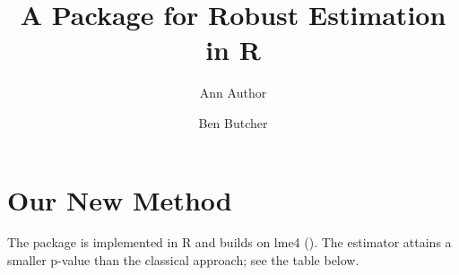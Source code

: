 \documentclass[article]{jss}
\author{Ann Author\and Ben Butcher}
\title{A Package for Robust Estimation in R}
\begin{document}
\section{Our New Method}
The package is implemented in R and builds on lme4
(\cite{bates2015}). The estimator attains a smaller p-value
than the classical approach; see the table below.
\end{document}
